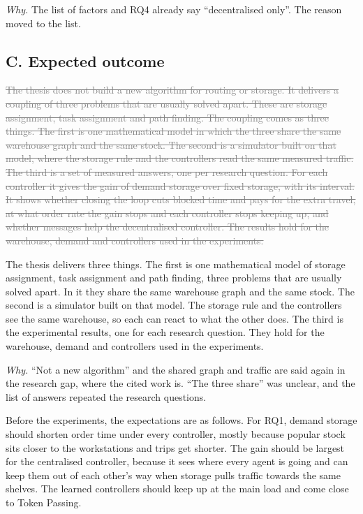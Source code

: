 \documentclass[11pt,a4paper]{article}
\newcommand{\new}[1]{\textcolor{newc}{#1}}
\newcommand{\old}[1]{\textcolor{gray}{\sout{#1}}}
\newcommand{\why}[1]{\textcolor{notec}{\small\emph{Why.} #1}\par}
\begin{document}
\why{The list of factors and RQ4 already say ``decentralised only''. The reason moved to the list.}

\subsection*{C. Expected outcome}

\old{The thesis does not build a new algorithm for routing or storage. It delivers a coupling of three
problems that are usually solved apart. These are storage assignment, task assignment and path
finding. The coupling comes as three things. The first is one mathematical model in which the three
share the same warehouse graph and the same stock. The second is a simulator built on that model,
where the storage rule and the controllers read the same measured traffic. The third is a set of
measured answers, one per research question. For each controller it gives the gain of demand storage
over fixed storage, with its interval. It shows whether closing the loop cuts blocked time and pays
for the extra travel, at what order rate the gain stops and each controller stops keeping up, and
whether messages help the decentralised controller. The results hold for the warehouse, demand and
controllers used in the experiments.}

\new{The thesis delivers three things. The first is one mathematical model of storage assignment,
task assignment and path finding, three problems that are usually solved apart. In it they share the
same warehouse graph and the same stock. The second is a simulator built on that model. The storage
rule and the controllers see the same warehouse, so each can react to what the other does. The third
is the experimental results, one for each research question. They hold for the warehouse, demand and
controllers used in the experiments.}

\why{``Not a new algorithm'' and the shared graph and traffic are said again in the research gap, where
the cited work is. ``The three share'' was unclear, and the list of answers repeated the research
questions.}

Before the experiments, the expectations are as follows. For RQ1, demand storage should shorten order
time under every controller, mostly because popular stock sits closer to the workstations and trips
get shorter. The gain should be largest for the centralised controller, because it sees where every
agent is going and can keep them out of each other's way when storage pulls traffic towards the same
shelves. The learned controllers should keep up at the main load and come close to Token Passing.
\end{document}
